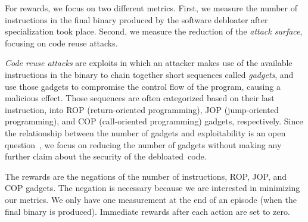 For rewards, we focus on two different metrics. First, we measure the
number of instructions in the final binary produced by the software debloater
after specialization took place. Second, we measure the reduction of the
\emph{attack surface}, focusing on code reuse attacks.

\emph{Code reuse attacks} are exploits in which an attacker makes use of the
available instructions in the binary to chain together short sequences called
\textit{gadgets}, and use those gadgets to compromise the control flow of the
program, causing a malicious effect. Those sequences are often categorized based
on their last instruction, into ROP (return-oriented programming), JOP
(jump-oriented programming), and COP (call-oriented programming) gadgets,
respectively. Since the relationship between the number of gadgets and
exploitability is an open question~\cite{gsa}, we focus on reducing the number
of gadgets without making any further claim about the security of the debloated~code.

The rewards are the negations of the number of instructions, ROP, JOP, and COP
gadgets. The negation is necessary because we are interested in minimizing our
metrics. We only have one measurement at the end of an episode (when the final
binary is produced). Immediate rewards after each action are set to zero.

